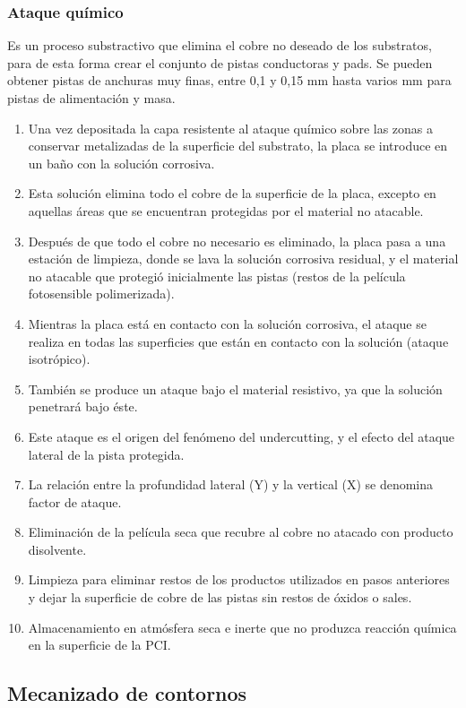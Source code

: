 \subsubsection{Ataque químico}
Es un proceso substractivo que elimina el cobre no deseado de los substratos, para de esta forma crear el conjunto de pistas conductoras y pads. Se pueden obtener pistas de anchuras muy finas, entre 0,1 y 0,15 mm hasta varios mm para pistas de alimentación y masa. 
\begin{enumerate}
    \item Una vez depositada la capa resistente al ataque químico sobre las zonas a conservar metalizadas de la superficie del substrato, la placa se introduce en un baño con la solución corrosiva.
    \item Esta solución elimina todo el cobre de la superficie de la placa, excepto en aquellas áreas que se encuentran protegidas por el material no atacable.
    \item Después de que todo el cobre no necesario es eliminado, la placa pasa a una estación de limpieza, donde se lava la solución corrosiva residual, y el material no atacable que protegió inicialmente las pistas (restos de la película fotosensible polimerizada).
    \item Mientras la placa está en contacto con la solución corrosiva, el ataque se realiza en todas las superficies que están en contacto con la solución (ataque isotrópico).
    \item También se produce un ataque bajo el material resistivo, ya que la solución penetrará bajo éste.
    \item Este ataque es el origen del fenómeno del undercutting, y el efecto del ataque lateral de la pista protegida.
    \item La relación entre la profundidad lateral (Y) y la vertical (X) se denomina factor de ataque.
    \item Eliminación de la película seca que recubre al cobre no atacado con producto disolvente.
    \item Limpieza para eliminar restos de los productos utilizados en pasos anteriores y dejar la superficie de cobre de las pistas sin restos de óxidos o sales.
    \item Almacenamiento en atmósfera seca e inerte que no produzca reacción química en la superficie de la PCI.
\end{enumerate}

\subsection{Mecanizado de contornos}
